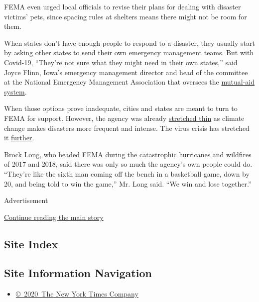 FEMA even urged local officials to revise their plans for dealing with
disaster victims' pets, since spacing rules at shelters means there
might not be room for them.

When states don't have enough people to respond to a disaster, they
usually start by asking other states to send their own emergency
management teams. But with Covid-19, ``They're not sure what they might
need in their own states,'' said Joyce Flinn, Iowa's emergency
management director and head of the committee at the National Emergency
Management Association that oversees the
\href{https://www.bloomberg.com/news/articles/2017-10-06/fewer-states-sent-help-to-puerto-rico-than-to-texas-or-florida?sref=UBrhZ1ro}{mutual-aid
system}.

When those options prove inadequate, cities and states are meant to turn
to FEMA for support. However, the agency was already
\href{https://www.gao.gov/products/GAO-20-360}{stretched thin} as
climate change makes disasters more frequent and intense. The virus
crisis has stretched it
\href{https://www.nytimes.com/2020/04/03/climate/fema-staff-shortage-coronavirus.html}{further}.

Brock Long, who headed FEMA during the catastrophic hurricanes and
wildfires of 2017 and 2018, said there was only so much the agency's own
people could do. ``They're like the sixth man coming off the bench in a
basketball game, down by 20, and being told to win the game,'' Mr. Long
said. ``We win and lose together.''

Advertisement

\protect\hyperlink{after-bottom}{Continue reading the main story}

\hypertarget{site-index}{%
\subsection{Site Index}\label{site-index}}

\hypertarget{site-information-navigation}{%
\subsection{Site Information
Navigation}\label{site-information-navigation}}

\begin{itemize}
\tightlist
\item
  \href{https://help.nytimes.com/hc/en-us/articles/115014792127-Copyright-notice}{©~2020~The
  New York Times Company}
\end{itemize}

